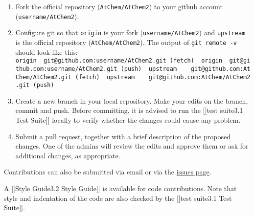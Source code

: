 \begin{enumerate}
\def\labelenumi{\arabic{enumi}.}
\item
  Fork the official repository (\texttt{AtChem/AtChem2}) to your github
  account (\texttt{username/AtChem2}).
\item
  Configure git so that \texttt{origin} is your fork
  (\texttt{username/AtChem2}) and \texttt{upstream} is the official
  repository (\texttt{AtChem/AtChem2}). The output of
  \texttt{git\ remote\ -v} should look like this:
  \texttt{origin\ \ git@github.com:username/AtChem2.git\ (fetch)\ \ origin\ \ git@github.com:username/AtChem2.git\ (push)\ \ upstream\ \ \ \ git@github.com:AtChem/AtChem2.git\ (fetch)\ \ upstream\ \ \ \ git@github.com:AtChem/AtChem2.git\ (push)}
\item
  Create a new branch in your local repository. Make your edits on the
  branch, commit and push. Before committing, it is advised to run the
  {[}{[}test suite\textbar{}3.1 Test Suite{]}{]} locally to verify
  whether the changes could cause any problem.
\item
  Submit a pull request, together with a brief description of the
  proposed changes. One of the admins will review the edits and approve
  them or ask for additional changes, as appropriate.
\end{enumerate}

Contributions can also be submitted via email or via the
\href{https://github.com/AtChem/AtChem2/issues}{issues page}.

A {[}{[}Style Guide\textbar{}3.2 Style Guide{]}{]} is available for code
contributions. Note that style and indentation of the code are also
checked by the {[}{[}test suite\textbar{}3.1 Test Suite{]}{]}.
